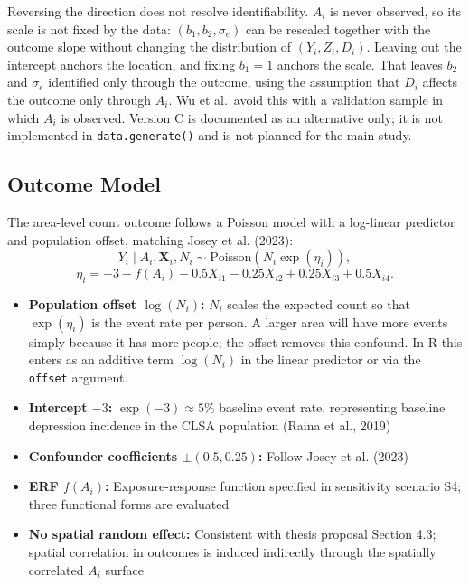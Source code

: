 \documentclass[11pt]{article}
\begin{document}
Reversing the direction does not resolve identifiability. $A_i$ is never observed, so its scale
is not fixed by the data: $(b_1, b_2, \sigma_e)$ can be rescaled together with the outcome slope
without changing the distribution of $(Y_i, Z_i, D_i)$. Leaving out the intercept anchors the location, and fixing
$b_1 = 1$ anchors the scale. That leaves $b_2$ and
$\sigma_e$ identified only through the outcome, using the assumption that $D_i$ affects the outcome only through $A_i$. Wu et al.\
avoid this with a validation sample in which $A_i$ is observed. Version C is documented as an alternative
only; it is not implemented in \texttt{data.generate()} and is not planned for the main study.

\subsection{Outcome Model}

The area-level count outcome follows a Poisson model with a log-linear predictor and
population offset, matching Josey et al. (2023):
\begin{equation}
Y_i \mid A_i, \mathbf{X}_i, N_i \sim \text{Poisson}(N_i \exp(\eta_i)),
\label{eq:outcome}
\end{equation}
\begin{equation}
\eta_i = -3 + f(A_i) - 0.5X_{i1} - 0.25X_{i2} + 0.25X_{i3} + 0.5X_{i4}.
\end{equation}

\begin{itemize}
\item \textbf{Population offset $\log(N_i)$:} $N_i$ scales the expected count so that
$\exp(\eta_i)$ is the event rate per person. A larger area will have more events simply
because it has more people; the offset removes this confound. In R this enters as an
additive term $\log(N_i)$ in the linear predictor or via the \texttt{offset} argument.
\item \textbf{Intercept $-3$:} $\exp(-3) \approx 5\%$ baseline event rate, representing
baseline depression incidence in the CLSA population (Raina et al., 2019)
\item \textbf{Confounder coefficients $\pm(0.5, 0.25)$:} Follow Josey et al. (2023)
\item \textbf{ERF $f(A_i)$:} Exposure-response function specified in sensitivity
scenario S4; three functional forms are evaluated
\item \textbf{No spatial random effect:} Consistent with thesis proposal Section 4.3;
spatial correlation in outcomes is induced indirectly through the spatially correlated
$A_i$ surface
\end{itemize}
\end{document}

